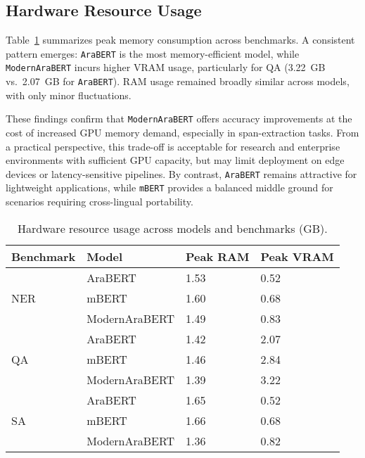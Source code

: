\subsection{Hardware Resource Usage}
Table~\ref{tab:hardware_usage} summarizes peak memory consumption across benchmarks. A consistent pattern emerges: \texttt{AraBERT} is the most memory-efficient model, while \texttt{ModernAraBERT} incurs higher VRAM usage, particularly for QA (3.22~GB vs.~2.07~GB for \texttt{AraBERT}). RAM usage remained broadly similar across models, with only minor fluctuations.  

These findings confirm that \texttt{ModernAraBERT} offers accuracy improvements at the cost of increased GPU memory demand, especially in span-extraction tasks. From a practical perspective, this trade-off is acceptable for research and enterprise environments with sufficient GPU capacity, but may limit deployment on edge devices or latency-sensitive pipelines. By contrast, \texttt{AraBERT} remains attractive for lightweight applications, while \texttt{mBERT} provides a balanced middle ground for scenarios requiring cross-lingual portability.  

\begin{table}[!ht]
\label{tab:hardware_usage}
\begin{center}
\small
\begin{tabularx}{\columnwidth}{|l|l|X|X|}
      \hline
      \textbf{Benchmark} & \textbf{Model} & \textbf{Peak RAM} & \textbf{Peak VRAM} \\
      \midrule 
      \multirow{3}{*}{NER} & AraBERT & 1.53 & 0.52 \\
                           & mBERT & 1.60 & 0.68 \\
                           & ModernAraBERT & 1.49 & 0.83 \\
      \hline
      \multirow{3}{*}{QA}  & AraBERT & 1.42 & 2.07 \\
                           & mBERT & 1.46 & 2.84 \\
                           & ModernAraBERT & 1.39 & 3.22 \\
      \hline
      \multirow{3}{*}{SA}  & AraBERT & 1.65 & 0.52 \\
                           & mBERT & 1.66 & 0.68 \\
                           & ModernAraBERT & 1.36 & 0.82 \\
      \hline
\end{tabularx}
\caption{Hardware resource usage across models and benchmarks (GB).}
\end{center}
\end{table}


